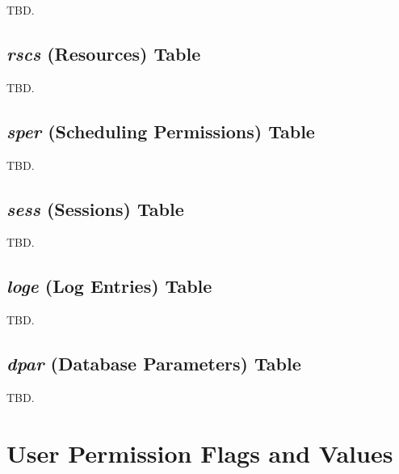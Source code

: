 \documentclass[letterpaper,10pt,titlepage]{article}
\begin{document}

TBD.

\subsection{\emph{rscs} (Resources) Table}
\label{sdtf0:srsc0}


TBD.

\subsection{\emph{sper} (Scheduling Permissions) Table}
\label{sdtf0:sspr0}


TBD.

\subsection{\emph{sess} (Sessions) Table}
\label{sdtf0:sses0}


TBD.

\subsection{\emph{loge} (Log Entries) Table}
\label{sdtf0:slge0}


TBD.

\subsection{\emph{dpar} (Database Parameters) Table}
\label{sdtf0:sdpr0}


TBD.



\clearpage{}
\section{User Permission Flags and Values}
\label{supf0}
\end{document}
